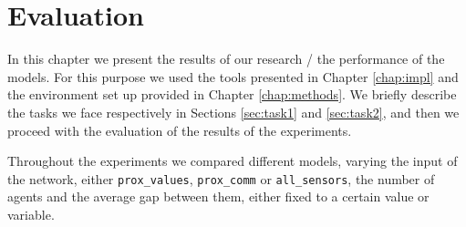 \chapter{Evaluation}
\label{chap:experiments}

In this chapter we present the results of our research / the performance of the 
models. 
For this purpose we used the tools presented in Chapter \ref{chap:impl} and the 
environment set up provided in Chapter \ref{chap:methods}.
We briefly describe the tasks we face respectively in Sections \ref{sec:task1} and 
\ref{sec:task2}, and then we proceed with the evaluation of the results of the 
experiments.

Throughout the experiments we compared different models, varying the input of 
the network, either \texttt{prox\_values}, \texttt{prox\_comm} or 
\texttt{all\_sensors}, the number of agents and the average gap between them, 
either fixed to a certain value or variable.



